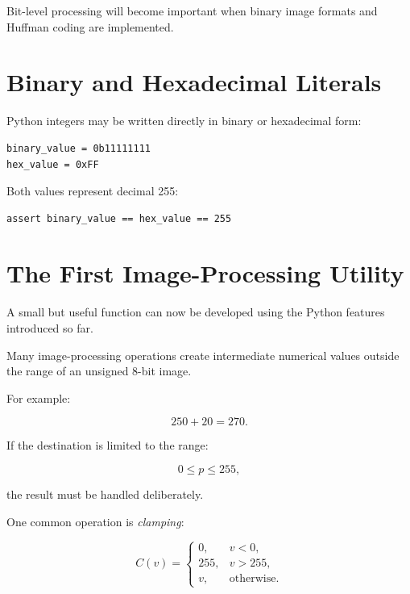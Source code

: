 Bit-level processing will become important when binary image formats
and Huffman coding are implemented.


\section{Binary and Hexadecimal Literals}
\label{sec:binary-hexadecimal}

Python integers may be written directly in binary or hexadecimal
form:

\begin{verbatim}
binary_value = 0b11111111
hex_value = 0xFF
\end{verbatim}

Both values represent decimal 255:

\begin{verbatim}
assert binary_value == hex_value == 255
\end{verbatim}


\section{The First Image-Processing Utility}
\label{sec:first-utility}

A small but useful function can now be developed using the Python
features introduced so far.

Many image-processing operations create intermediate numerical values
outside the range of an unsigned 8-bit image.

For example:

\begin{equation}
250 + 20 = 270.
\end{equation}

If the destination is limited to the range:

\begin{equation}
0 \leq p \leq 255,
\end{equation}

the result must be handled deliberately.

One common operation is \emph{clamping}:

\begin{equation}
C(v) =
\begin{cases}
0,   & v < 0,\\
255, & v > 255,\\
v,   & \text{otherwise}.
\end{cases}
\end{equation}


